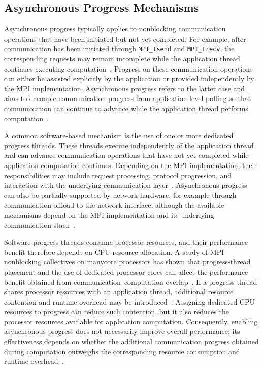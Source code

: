 \subsection{Asynchronous Progress Mechanisms}

Asynchronous progress typically applies to nonblocking communication operations that have been initiated but not yet completed. For example, after communication has been initiated through \texttt{MPI\_Isend} and \texttt{MPI\_Irecv}, the corresponding requests may remain incomplete while the application thread continues executing computation~\cite[Sec.~4.7]{mpi50}. Progress on these communication operations can either be assisted explicitly by the application or provided independently by the MPI implementation. Asynchronous progress refers to the latter case and aims to decouple communication progress from application-level polling so that communication can continue to advance while the application thread performs computation~\cite{ruhela2019async}.

A common software-based mechanism is the use of one or more dedicated progress threads. These threads execute independently of the application thread and can advance communication operations that have not yet completed while application computation continues. Depending on the MPI implementation, their responsibilities may include request processing, protocol progression, and interaction with the underlying communication layer~\cite{ruhela2019async}. Asynchronous progress can also be partially supported by network hardware, for example through communication offload to the network interface, although the available mechanisms depend on the MPI implementation and its underlying communication stack~\cite[Sec.~3.9]{mpi50}.

Software progress threads consume processor resources, and their performance benefit therefore depends on CPU-resource allocation. A study of MPI nonblocking collectives on manycore processors has shown that progress-thread placement and the use of dedicated processor cores can affect the performance benefit obtained from communication--computation overlap~\cite{denis2019progressThreads}. If a progress thread shares processor resources with an application thread, additional resource contention and runtime overhead may be introduced~\cite{ruhela2019async}. Assigning dedicated CPU resources to progress can reduce such contention, but it also reduces the processor resources available for application computation. Consequently, enabling asynchronous progress does not necessarily improve overall performance; its effectiveness depends on whether the additional communication progress obtained during computation outweighs the corresponding resource consumption and runtime overhead~\cite{ruhela2019async}.


